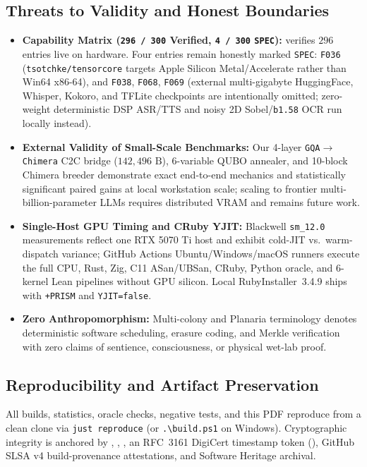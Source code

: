 \documentclass[11pt,letterpaper]{amsart}
\newcommand{\code}[1]{{\small\texttt{#1}}}
\begin{document}
\subsection{Threats to Validity and Honest Boundaries}
\begin{itemize}
  \item \textbf{Capability Matrix (\code{296 / 300} Verified, \code{4 / 300} \code{SPEC}):}
   verifies $296$ entries live on
  hardware. Four entries remain honestly marked \code{SPEC}: \code{F036}
  (\code{tsotchke/tensorcore} targets Apple Silicon Metal/Accelerate rather than
  Win64 x86-64), and \code{F038}, \code{F068}, \code{F069} (external multi-gigabyte
  HuggingFace, Whisper, Kokoro, and TFLite checkpoints are intentionally omitted;
  zero-weight deterministic DSP ASR/TTS and noisy 2D Sobel/\code{b1.58} OCR run
  locally instead).
  \item \textbf{External Validity of Small-Scale Benchmarks:} Our 4-layer
  \code{GQA}$\to$\code{Chimera} C2C bridge ($142{,}496\text{ B}$), 6-variable QUBO
  annealer, and 10-block Chimera breeder demonstrate exact end-to-end mechanics and
  statistically significant paired gains at local workstation scale; scaling to
  frontier multi-billion-parameter LLMs requires distributed VRAM and remains
  future work.
  \item \textbf{Single-Host GPU Timing and CRuby YJIT:} Blackwell \code{sm\_12.0}
  measurements reflect one RTX 5070 Ti host and exhibit cold-JIT vs.\ warm-dispatch
  variance; GitHub Actions Ubuntu/Windows/macOS runners execute the full CPU,
  Rust, Zig, C11 ASan/UBSan, CRuby, Python oracle, and 6-kernel Lean pipelines
  without GPU silicon. Local RubyInstaller~3.4.9 ships with \code{+PRISM} and
  \code{YJIT=false}.
  \item \textbf{Zero Anthropomorphism:} Multi-colony and Planaria terminology
  denotes deterministic software scheduling, erasure coding, and Merkle verification
  with zero claims of sentience, consciousness, or physical wet-lab proof.
\end{itemize}

\subsection{Reproducibility and Artifact Preservation}
All builds, statistics, oracle checks, negative tests, and this PDF reproduce from
a clean clone via \code{just reproduce} (or \code{.\textbackslash build.ps1} on
Windows). Cryptographic integrity is anchored by ,
, , an RFC~3161 DigiCert
timestamp token (), GitHub SLSA v4
build-provenance attestations, and Software Heritage archival.
\end{document}
